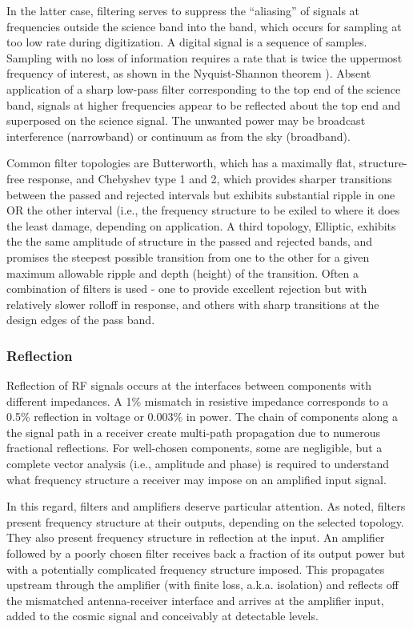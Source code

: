 In the latter case, filtering serves to suppress the ``aliasing'' of signals at frequencies outside the science band into the band, which occurs for sampling at too low rate during digitization.  A digital signal is a sequence of samples.  Sampling with no loss of information requires a rate that is twice the uppermost frequency of interest, as shown in the Nyquist-Shannon theorem \cite{TMS17}). Absent application of a sharp low-pass filter corresponding to the top end of the science band, signals at higher frequencies appear to be reflected about the top end and superposed on the science signal.  The unwanted power may be broadcast interference (narrowband) or continuum as from the sky (broadband).

 Common filter topologies are Butterworth, which has a maximally flat, structure-free response, and Chebyshev type 1 and 2, which provides sharper transitions between the passed and rejected intervals but exhibits substantial ripple in one OR the other interval (i.e., the frequency structure to be exiled to where it does the least damage, depending on application.  A third topology, Elliptic, exhibits the the same amplitude of structure in the passed and rejected bands, and promises the steepest possible transition from one to the other for a given maximum allowable ripple and depth (height) of the transition.  Often a combination of filters is used - one to provide excellent rejection but with relatively slower rolloff in response, and others with sharp transitions at the design edges of the pass band.  
   
\subsubsection{Reflection}

Reflection of RF signals occurs at the interfaces between components with different impedances.  A 1\% mismatch in resistive impedance corresponds to a 0.5\% reflection in voltage or 0.003\% in power.  The chain of components along a the signal path in a receiver create multi-path propagation due to numerous fractional reflections.  For well-chosen components, some are negligible, but a complete vector analysis (i.e., amplitude and phase) is required to understand what frequency structure a receiver may impose on an amplified input signal.  

In this regard, filters and amplifiers deserve particular attention.  As noted, filters present frequency structure at their outputs, depending on the selected topology.  They also present frequency structure in reflection at the input. An amplifier followed by a poorly chosen filter receives back a fraction of its output power but with a potentially complicated frequency structure imposed.  This propagates upstream through the amplifier (with finite loss, a.k.a. isolation) and reflects off the mismatched antenna-receiver interface and arrives at the amplifier input, added to the cosmic signal and conceivably at detectable levels.

